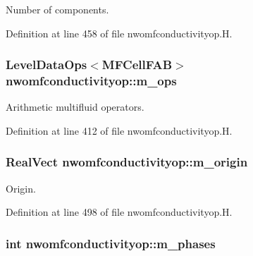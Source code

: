 Number of components. 



Definition at line 458 of file nwomfconductivityop.\+H.

\subsubsection[{\texorpdfstring{m\+\_\+ops}{m_ops}}]{\setlength{\rightskip}{0pt plus 5cm}Level\+Data\+Ops$<$M\+F\+Cell\+F\+AB$>$ nwomfconductivityop\+::m\+\_\+ops\hspace{0.3cm}{\ttfamily [protected]}}\hypertarget{classnwomfconductivityop_ae3c702945e77489bf909d10be7f14cb5}{}\label{classnwomfconductivityop_ae3c702945e77489bf909d10be7f14cb5}


Arithmetic multifluid operators. 



Definition at line 412 of file nwomfconductivityop.\+H.

\subsubsection[{\texorpdfstring{m\+\_\+origin}{m_origin}}]{\setlength{\rightskip}{0pt plus 5cm}Real\+Vect nwomfconductivityop\+::m\+\_\+origin\hspace{0.3cm}{\ttfamily [protected]}}\hypertarget{classnwomfconductivityop_a52affc53f755c6175791dc4af2da1a6b}{}\label{classnwomfconductivityop_a52affc53f755c6175791dc4af2da1a6b}


Origin. 



Definition at line 498 of file nwomfconductivityop.\+H.

\subsubsection[{\texorpdfstring{m\+\_\+phases}{m_phases}}]{\setlength{\rightskip}{0pt plus 5cm}int nwomfconductivityop\+::m\+\_\+phases\hspace{0.3cm}{\ttfamily [protected]}}\hypertarget{classnwomfconductivityop_a2c1f4411cb7f77c9b2a3f4a9b4792c16}{}\label{classnwomfconductivityop_a2c1f4411cb7f77c9b2a3f4a9b4792c16}


